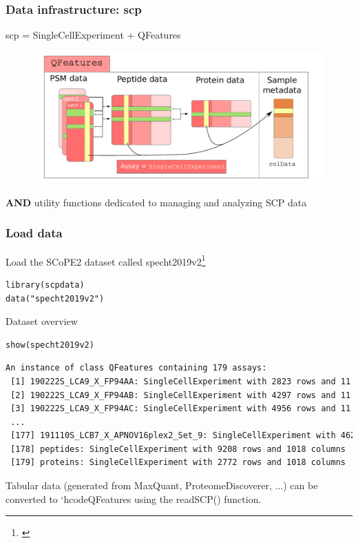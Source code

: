 \documentclass{beamer}
\newcommand{\hcode}[2][lgray]{{\ttfamily\color{vdgray}\colorbox{#1}{#2}}}
\newcommand{\frametitlesection}[1]{\frametitle{\centering #1 \footnotesize \hspace{0pt plus 1 filll} \insertsection}}
\begin{document}
\begin{frame}
    \frametitlesection{Data infrastructure: scp}

    \hcode{scp} = \hcode{SingleCellExperiment} + \hcode{QFeatures}
    \begin{figure}
        \centering
        \includegraphics[width=\linewidth]{figs/SCP_framework.pdf}
    \end{figure}
    
    \textbf{AND} utility functions dedicated to managing and analyzing SCP data 


\end{frame}

\begin{frame}[fragile]
    \frametitlesection{Load data}

    Load the SCoPE2 dataset called \hcode{specht2019v2}\footnote{\citet{Specht2019-jm}}

    \begin{lstlisting}
library(scpdata)
data("specht2019v2")
    \end{lstlisting}

    Dataset overview

    \begin{lstlisting}
show(specht2019v2)
    \end{lstlisting}

    \begin{lstlisting}[language = TeX, numbers = none, basicstyle = \tiny\ttfamily\color{vdgray}]
An instance of class QFeatures containing 179 assays:
 [1] 190222S_LCA9_X_FP94AA: SingleCellExperiment with 2823 rows and 11 col...
 [2] 190222S_LCA9_X_FP94AB: SingleCellExperiment with 4297 rows and 11 col...
 [3] 190222S_LCA9_X_FP94AC: SingleCellExperiment with 4956 rows and 11 col...
 ...
 [177] 191110S_LCB7_X_APNOV16plex2_Set_9: SingleCellExperiment with 4626 r...
 [178] peptides: SingleCellExperiment with 9208 rows and 1018 columns
 [179] proteins: SingleCellExperiment with 2772 rows and 1018 columns
    \end{lstlisting}

    \bigskip
    \footnotesize
    Tabular data (generated from MaxQuant, ProteomeDiscoverer,
    ...) can be converted to `hcode{QFeatures} using the \hcode{readSCP()} function.
\end{frame}
\end{document}
